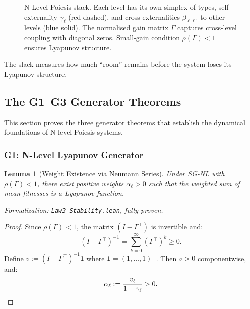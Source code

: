 \documentclass[12pt]{article}
\newtheorem{lemma}[theorem]{Lemma}
\begin{document}
\begin{figure}[h]
\caption{N-Level Poiesis stack. Each level has its own simplex of types, self-externality $\gamma_\ell$ (red dashed), and cross-externalities $\beta_{\ell\ell'}$ to other levels (blue solid). The normalised gain matrix $\Gamma$ captures cross-level coupling with diagonal zeros. Small-gain condition $\rho(\Gamma) < 1$ ensures Lyapunov structure.}
\label{fig:n-level-stack}
\end{figure}

The slack measures how much ``room'' remains before the system loses its Lyapunov structure.


\subsection{The G1--G3 Generator Theorems}
\label{sec:g1-g3}

This section proves the three generator theorems that establish the dynamical foundations of N-level Poiesis systems.

\subsubsection{G1: N-Level Lyapunov Generator}

\begin{lemma}[Weight Existence via Neumann Series]
\label{lem:weight-existence}
Under SG-NL with $\rho(\Gamma) < 1$, there exist positive weights $\alpha_\ell > 0$ such that the weighted sum of mean fitnesses is a Lyapunov function.
\end{lemma}
\noindent\textit{Formalization: \texttt{Law3\_Stability.lean}, fully proven.}

\begin{proof}
Since $\rho(\Gamma) < 1$, the matrix $(I - \Gamma^\top)$ is invertible and:
\[
(I - \Gamma^\top)^{-1} = \sum_{k=0}^\infty (\Gamma^\top)^k \geq 0.
\]
Define $v := (I - \Gamma^\top)^{-1} \mathbf{1}$ where $\mathbf{1} = (1, \ldots, 1)^\top$. Then $v > 0$ componentwise, and:
\[
\alpha_\ell := \frac{v_\ell}{1 - \gamma_\ell} > 0. \qedhere
\]
\end{proof}
\end{document}
